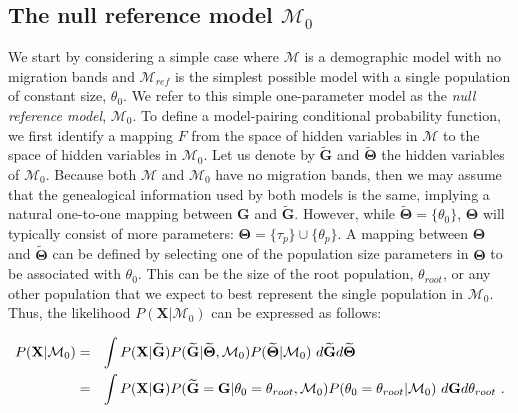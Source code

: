 \documentclass[11pt]{article}
\newcommand{\vect}[1]{\boldsymbol{\mathbf{#1}}}
\newcommand{\X}{\vect{X}}
\newcommand{\M}{\mathcal{M}}
\newcommand{\G}{\vect{G}}
\newcommand{\T}{\vect{\Theta}}
\newcommand{\GT}{\G\T}
\newcommand{\Mref}{\M_{ref}}
\newcommand{\Gref}{\widetilde{\G}}
\newcommand{\Tref}{\widetilde{\T}}
\newcommand{\troot}{\theta_{root}}
\begin{document}
\subsection*{The null reference model $\M_0$}

We start by considering a simple case where $\M$ is a demographic model with no migration bands and $\Mref$
is the simplest possible model with a single population of constant size, $\theta_0$.
%
We refer to this simple one-parameter model as the {\em null reference model}, $\M_0$.
%
To define a model-pairing conditional probability function, we first identify a mapping $F$ from the space
of hidden variables in $\M$ to the space of hidden variables in $\M_0$.
%
Let us denote by $\Gref$ and $\Tref$ the hidden variables of $\M_0$.
%
Because both $\M$ and $\M_0$ have no migration bands, then we may assume that the genealogical information used
by both models is the same, implying a natural one-to-one mapping between $\G$ and $\Gref$.
%
However, while $\Tref=\{\theta_0\}$, $\T$ will typically consist of more parameters: $\T=\{\tau_p\}\cup\{\theta_p\}$.
%
A mapping between $\T$ and $\Tref$ can be defined by selecting one of the population size parameters in $\T$
to be associated with $\theta_0$. This can be the size of the root population, $\troot$, or any other population
that we expect to best represent the single population in $\M_0$. 
%
Thus, %
%
the likelihood $P(\X|\M_0)$ can be expressed as follows:
%
%
\begin{small}
\begin{align}
P(\X|\M_0)
&=~~ \int P(\X|\Gref) P(\Gref|\Tref,\M_0) P(\Tref|\M_0)\ d\Gref d\Tref  \notag \\ %
&=~~ \int P(\X|\G) P(\Gref=\G|\theta_0=\troot,\M_0) P(\theta_0=\troot|\M_0)\ d\G d\troot  ~. \notag
\end{align}
\end{small}
\end{document}

